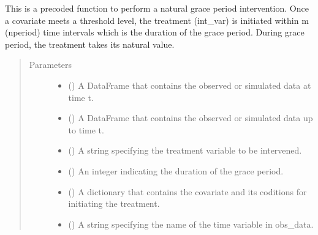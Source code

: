 \documentclass[letterpaper,10pt,english]{sphinxmanual}
\begin{document}
\begin{fulllineitems}
\label{\detokenize{Specifications/Interventions:pygformula.parametric_gformula.interventions.natural_grace_period}}
\sphinxAtStartPar
This is a pre\sphinxhyphen{}coded function to perform a natural grace period intervention. Once a covariate
meets a threshold level, the treatment (int\_var) is initiated within m (nperiod) time intervals which is the duration
of the grace period. During grace period, the treatment takes its natural value.
\begin{quote}\begin{description}
\item[{Parameters}] \leavevmode\begin{itemize}
\item {} 
\sphinxAtStartPar
{} () \textendash{} A DataFrame that contains the observed or simulated data at time t.

\item {} 
\sphinxAtStartPar
{} () \textendash{} A DataFrame that contains the observed or simulated data up to time t.

\item {} 
\sphinxAtStartPar
{} () \textendash{} A string specifying the treatment variable to be intervened.

\item {} 
\sphinxAtStartPar
{} () \textendash{} An integer indicating the duration of the grace period.

\item {} 
\sphinxAtStartPar
{} () \textendash{} A dictionary that contains the covariate and its coditions for initiating the treatment.

\item {} 
\sphinxAtStartPar
{} () \textendash{} A string specifying the name of the time variable in obs\_data.


\end{itemize}
\end{description}
\end{quote}
\end{fulllineitems}
\end{document}
